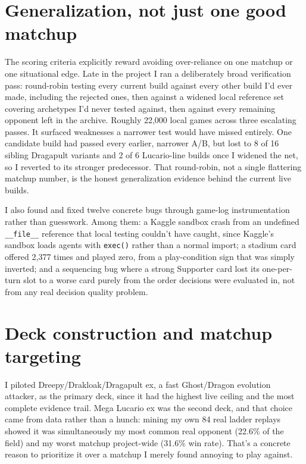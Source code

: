\documentclass[11pt]{article}
\begin{document}
\section*{Generalization, not just one good matchup}

The scoring criteria explicitly reward avoiding over-reliance on one matchup or one situational edge. Late in the project I ran a deliberately broad verification pass: round-robin testing every current build against every other build I'd ever made, including the rejected ones, then against a widened local reference set covering archetypes I'd never tested against, then against every remaining opponent left in the archive. Roughly 22,000 local games across three escalating passes. It surfaced weaknesses a narrower test would have missed entirely. One candidate build had passed every earlier, narrower A/B, but lost to 8 of 16 sibling Dragapult variants and 2 of 6 Lucario-line builds once I widened the net, so I reverted to its stronger predecessor. That round-robin, not a single flattering matchup number, is the honest generalization evidence behind the current live builds.

I also found and fixed twelve concrete bugs through game-log instrumentation rather than guesswork. Among them: a Kaggle sandbox crash from an undefined \texttt{\_\_file\_\_} reference that local testing couldn't have caught, since Kaggle's sandbox loads agents with \texttt{exec()} rather than a normal import; a stadium card offered 2,377 times and played zero, from a play-condition sign that was simply inverted; and a sequencing bug where a strong Supporter card lost its one-per-turn slot to a worse card purely from the order decisions were evaluated in, not from any real decision quality problem.

\section*{Deck construction and matchup targeting}

I piloted Dreepy/Drakloak/Dragapult ex, a fast Ghost/Dragon evolution attacker, as the primary deck, since it had the highest live ceiling and the most complete evidence trail. Mega Lucario ex was the second deck, and that choice came from data rather than a hunch: mining my own 84 real ladder replays showed it was simultaneously my most common real opponent (22.6\% of the field) and my worst matchup project-wide (31.6\% win rate). That's a concrete reason to prioritize it over a matchup I merely found annoying to play against.
\end{document}
